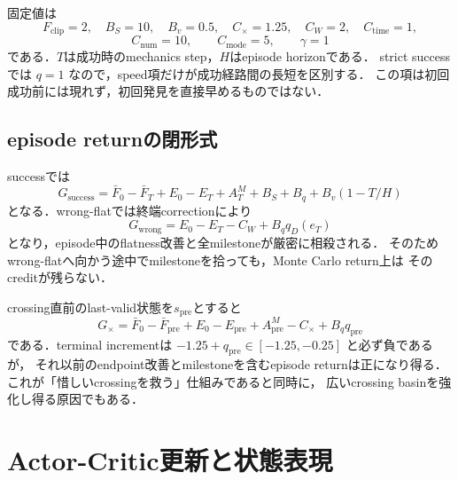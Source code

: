 \documentclass[a4paper,11pt]{ltjsarticle}
\begin{document}
固定値は
\begin{equation}
 F_{\mathrm{clip}}=2,\quad
 B_S=10,\quad B_v=0.5,\quad
 C_\times=1.25,\quad C_W=2,\quad C_{\mathrm{time}}=1,
\end{equation}
\begin{equation}
 C_{\mathrm{num}}=10,\qquad C_{\mathrm{mode}}=5,\qquad
 \gamma=1
 \label{eq:reward-constants}
\end{equation}
である．$T$は成功時のmechanics step，$H$はepisode horizonである．
strict successでは $q=1$ なので，speed項だけが成功経路間の長短を区別する．
この項は初回成功前には現れず，初回発見を直接早めるものではない．

\subsection{episode returnの閉形式}

successでは
\begin{equation}
 G_{\mathrm{success}}
 =\bar F_0-\bar F_T+E_0-E_T
 +A_T^M+B_S+B_q+B_v(1-T/H)
\end{equation}
となる．wrong-flatでは終端correctionにより
\begin{equation}
 G_{\mathrm{wrong}}
 =E_0-E_T-C_W+B_qq_D(e_T)
 \label{eq:wrong-total}
\end{equation}
となり，episode中のflatness改善と全milestoneが厳密に相殺される．
そのためwrong-flatへ向かう途中でmilestoneを拾っても，Monte Carlo return上は
そのcreditが残らない．

crossing直前のlast-valid状態を$s_{\mathrm{pre}}$とすると
\begin{equation}
 G_\times
 =\bar F_0-\bar F_{\mathrm{pre}}
  +E_0-E_{\mathrm{pre}}
  +A_{\mathrm{pre}}^M
  -C_\times+B_qq_{\mathrm{pre}}
 \label{eq:cross-total}
\end{equation}
である．terminal incrementは
$-1.25+q_{\mathrm{pre}}\in[-1.25,-0.25]$ と必ず負であるが，
それ以前のendpoint改善とmilestoneを含むepisode returnは正になり得る．
これが「惜しいcrossingを救う」仕組みであると同時に，
広いcrossing basinを強化し得る原因でもある．

\section{Actor-Critic更新と状態表現}
\label{sec:learning}
\end{document}
